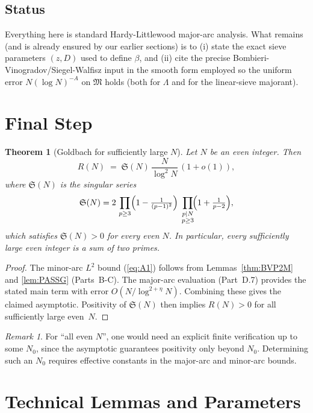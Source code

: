 \documentclass[11pt]{article}
\def\eqref#1{(\ref{#1})}%
\renewcommand{\thepart}{\Alph{part}}
\newtheorem{theorem}[lemma]{Theorem}
\theoremstyle{definition}
\theoremstyle{remark}
\newtheorem{remark}[lemma]{Remark}
\numberwithin{equation}{part}
\renewcommand{\thesection}{\thepart.\arabic{section}}
\begin{document}
\subsection{Status}
Everything here is standard Hardy-Littlewood major-arc analysis.  What remains (and is already ensured by our earlier sections) is to (i) state the exact sieve parameters $(z,D)$ used to define $\beta$, and (ii) cite the precise Bombieri-Vinogradov/Siegel-Walfisz input in the smooth form employed so the uniform error $N(\log N)^{-A}$ on $\mathfrak M$ holds (both for $\Lambda$ and for the linear-sieve majorant).

\section{Final Step}

\begin{theorem}[Goldbach for sufficiently large $N$]\label{thm:goldbach}
	Let $N$ be an even integer. Then
	\[
		R(N)\;=\;\mathfrak S(N)\,\frac{N}{\log^2 N}\,(1+o(1)),
	\]
	where $\mathfrak S(N)$ is the singular series
	\[
		\mathfrak S(N)
		=2\,\prod_{p\ge 3}\Bigl(1-\tfrac{1}{(p-1)^2}\Bigr)
		\;\prod_{\substack{p\mid N\\ p\ge 3}}\!\Bigl(1+\tfrac{1}{p-2}\Bigr),
	\]
	which satisfies $\mathfrak S(N)>0$ for every even $N$.
	In particular, every sufficiently large even integer is a sum of two primes.
\end{theorem}

\begin{proof}
	The minor-arc $L^2$ bound \eqref{eq:A1} follows from
	Lemmas~\ref{thm:BVP2M} and \ref{lem:PASSG} (Parts~B-C).
	The major-arc evaluation (Part~D.7) provides the stated main term with error $O(N/\log^{2+\eta}N)$.
	Combining these gives the claimed asymptotic.
	Positivity of $\mathfrak S(N)$ then implies $R(N)>0$ for all sufficiently large even~$N$.
\end{proof}

\begin{remark}
	For “all even $N$”, one would need an explicit finite verification up to some $N_0$, since the asymptotic guarantees positivity only beyond $N_0$. Determining such an $N_0$ requires effective constants in the major-arc and minor-arc bounds.
\end{remark}

\appendix
\renewcommand{\thesection}{Appendix~\Roman{section}}
\section{Technical Lemmas and Parameters}
\end{document}
